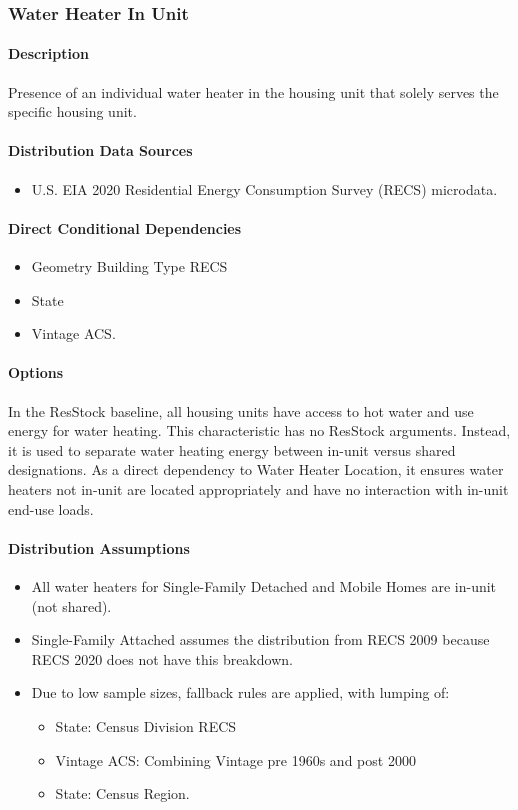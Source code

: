\subsubsection{Water Heater In Unit}\label{water_heater_in_unit}
\paragraph{Description}
Presence of an individual water heater in the housing unit that solely serves the specific housing unit.

\paragraph{Distribution Data Sources}
\begin{itemize}
\item
  U.S. EIA 2020 Residential Energy Consumption Survey (RECS) microdata.
\end{itemize}

\paragraph{Direct Conditional Dependencies}
\begin{itemize}
    \item Geometry Building Type RECS
    \item State
    \item Vintage ACS.
\end{itemize}

\paragraph{Options}
In the ResStock baseline, all housing units have access to hot water and use energy for water heating. This characteristic has no ResStock arguments. Instead, it is used to separate water heating energy between in-unit versus shared designations. As a direct dependency to Water Heater Location, it ensures water heaters not in-unit are located appropriately and have no interaction with in-unit end-use loads.

\paragraph{Distribution Assumptions}
\begin{itemize}
\item
  All water heaters for Single-Family Detached and Mobile Homes are in-unit (not shared).
\item
  Single-Family Attached assumes the distribution from RECS 2009 because RECS 2020 does not have this breakdown.
\item
  Due to low sample sizes, fallback rules are applied, with lumping of:

  \begin{itemize}
  \item
    State: Census Division RECS
  \item
    Vintage ACS: Combining Vintage pre 1960s and post 2000
  \item
    State: Census Region.
  \end{itemize}
\end{itemize}

